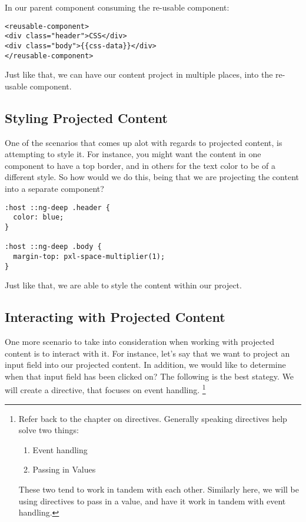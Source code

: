 In our parent component consuming the re-usable component:
\begin{lstlisting}
<reusable-component>
<div class="header">CSS</div>
<div class="body">{{css-data}}</div>
</reusable-component>
\end{lstlisting}

Just like that, we can have our content project in multiple places, into the
re-usable component.

\subsection{Styling Projected Content}
One of the scenarios that comes up alot with regards to projected content, is
attempting to style it. For instance, you might want the content in one
component to have a top border, and in others for the text color to be of a
different style. So how would we do this, being that we are projecting the
content into a separate component?
\begin{verbatim}
:host ::ng-deep .header {
  color: blue;
}

:host ::ng-deep .body {
  margin-top: pxl-space-multiplier(1);
}
\end{verbatim}

Just like that, we are able to style the content within our project.

\subsection{ Interacting with Projected Content }
One more scenario to take into consideration when working with projected content
is to interact with it. For instance, let's say that we want to project an
input field into our projected content. In addition, we would like to determine
when that input field has been clicked on? The following is the best stategy.
We will create a directive, that focuses on event handling.
\footnote{Refer back to the chapter on directives. Generally speaking directives
help solve two things:
\begin{enumerate}
  \item Event handling
  \item Passing in Values
\end{enumerate}
These two tend to work in tandem with each other. Similarly here, we will be
using directives to pass in a value, and have it work in tandem with event
handling.
}
